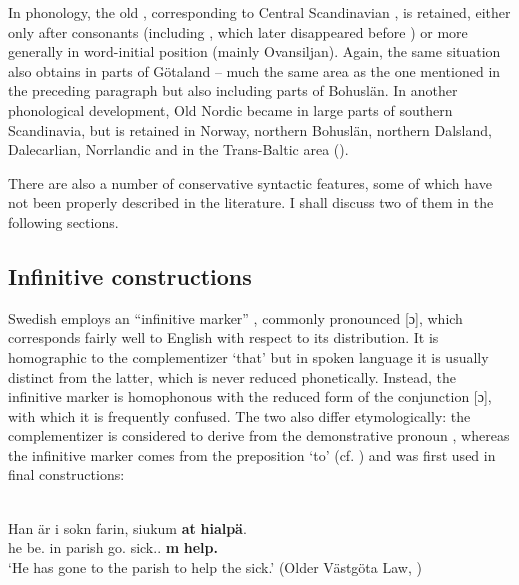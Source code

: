 In phonology, the old , corresponding to Central Scandinavian , is retained, either only after consonants (including , which later disappeared before ) or more generally in word-initial position (mainly Ovansiljan). Again, the same situation also obtains in parts of Götaland – much the same area as the one mentioned in the preceding paragraph but also including parts of Bohuslän. In another phonological development, Old Nordic  became in large parts of southern Scandinavia, but is retained in Norway, northern Bohuslän, northern Dalsland, Dalecarlian, Norrlandic and in the Trans-Baltic area (\citealt[57]{Wessén1966}).

There are also a number of conservative syntactic features, some of which have not been properly described in the literature. I shall discuss two of them in the following sections.

\subsection{Infinitive constructions}
\label{sec:6.4.1}

Swedish employs an “infinitive marker” , commonly pronounced [ɔ], which corresponds fairly well to English with respect to its distribution. It is homographic to the complementizer  ‘that’ but in spoken language it is usually distinct from the latter, which is never reduced phonetically. Instead, the infinitive marker is homophonous with the reduced form of the conjunction  [ɔ], with which it is frequently confused. The two  also differ etymologically: the complementizer is considered to derive from the demonstrative pronoun , whereas the infinitive marker comes from the preposition  ‘to’ (cf. ) and was first used in final constructions: 

\ea\label{}
\\
\gll Han  är  i  sokn  farin,  siukum  \textbf{at} \textbf{hialpä}.\\
he  be.{\prs}  in  parish  go.{\pp}  sick.{\dat}.{\pl}  \textbf{{{\inf}m}} \textbf{help.{\inf}}\\
\glt ‘He has gone to the parish to help the sick.’ (Older Västgöta Law, \citealt[136]{Wessén1956}) 
\z

